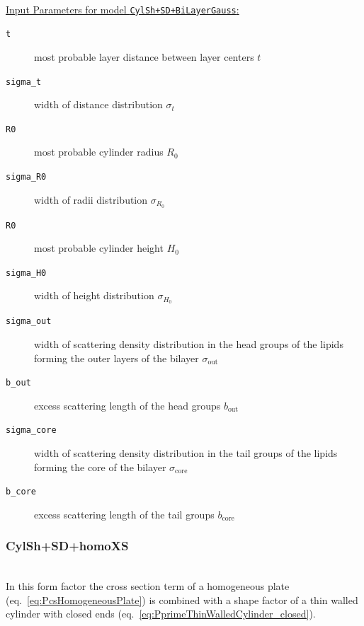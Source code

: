 \hspace{1pt}\\
\underline{Input Parameters for model \texttt{CylSh+SD+BiLayerGauss}:}\\
\begin{description}
\item[\texttt{t}] most probable layer distance between layer centers $t$
\item[\texttt{sigma\_t}] width of distance distribution $\sigma_t$
\item[\texttt{R0}] most probable cylinder radius $R_0$
\item[\texttt{sigma\_R0}] width of radii distribution $\sigma_{R_0}$
\item[\texttt{R0}] most probable cylinder height $H_0$
\item[\texttt{sigma\_H0}] width of height distribution $\sigma_{H_0}$
\item[\texttt{sigma\_out}] width of scattering density distribution in the head groups of the lipids forming the outer layers of the bilayer $\sigma_\mathrm{out}$
\item[\texttt{b\_out}] excess scattering length of the head groups $b_\mathrm{out}$
\item[\texttt{sigma\_core}] width of scattering density distribution in the tail groups of the lipids forming the core of the bilayer $\sigma_\mathrm{core}$
\item[\texttt{b\_core}] excess scattering length of the tail groups $b_\mathrm{core}$
\end{description}

\vspace{5mm}

\noindent
\subsubsection{CylSh+SD+homoXS} ~\\

\noindent
In this form factor the cross section term of a homogeneous plate (eq.\ \ref{eq:PcsHomogeneousPlate}) is combined with a shape factor of a thin walled cylinder with closed ends (eq.\ \ref{eq:PprimeThinWalledCylinder_closed}).

\vspace{5mm}

